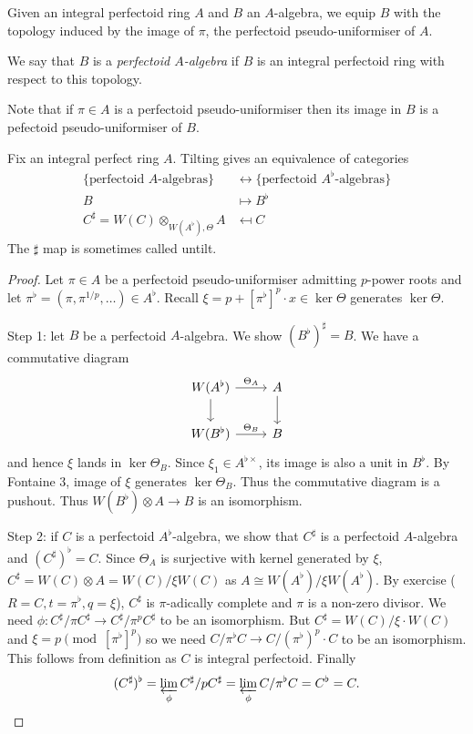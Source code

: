 \documentclass[a4paper]{article}
\newcommand{\tilt}{\flat} %
\begin{document}
\begin{definition}
  Given an integral perfectoid ring \(A\) and \(B\) an \(A\)-algebra, we equip \(B\) with the topology induced by the image of \(\pi\), the perfectoid pseudo-uniformiser of \(A\).

  We say that \(B\) is a \emph{perfectoid \(A\)-algebra} if \(B\) is an integral perfectoid ring with respect to this topology.
\end{definition}

Note that if \(\pi \in A\) is a perfectoid pseudo-uniformiser then its image in \(B\) is a pefectoid pseudo-uniformiser of \(B\).

\begin{theorem}
  Fix an integral perfect ring \(A\). Tilting gives an equivalence of categories
  \begin{align*}
    \{\text{perfectoid \(A\)-algebras}\} &\longleftrightarrow \{\text{perfectoid \(A^\tilt\)-algebras}\} \\
    B &\mapsto B^\tilt \\
    C^\sharp = W(C) \otimes_{W(A^\tilt), \Theta} A &\mapsfrom C
  \end{align*}
  The \(\sharp\) map is sometimes called untilt.
\end{theorem}

\begin{proof}
  Let \(\pi \in A\) be a perfectoid pseudo-uniformiser admitting \(p\)-power roots and let \(\pi^\tilt = (\pi, \pi^{1/p}, \dots) \in A^\tilt\). Recall \(\xi = p + [\pi^\tilt]^p \cdot x \in \ker \Theta\) generates \(\ker \Theta\).

  Step 1: let \(B\) be a perfectoid \(A\)-algebra. We show \((B^\tilt)^\sharp = B\). We have a commutative diagram
  \[
    \begin{tikzcd}
      W(A^\tilt) \ar[r, "\Theta_A"] \ar[d] & A \ar[d] \\
      W(B^\tilt) \ar[r, "\Theta_B"] & B
    \end{tikzcd}
  \]
  and hence \(\xi\) lands in \(\ker \Theta_B\). Since \(\xi_1 \in A^{\tilt \times}\), its image is also a unit in \(B^\tilt\). By Fontaine 3, image of \(\xi\) generates \(\ker \Theta_B\). Thus the commutative diagram is a pushout. Thus \(W(B^\tilt) \otimes A \to B\) is an isomorphism.

  Step 2: if \(C\) is a perfectoid \(A^\tilt\)-algebra, we show that \(C^\sharp\) is a perfectoid \(A\)-algebra and \((C^\sharp)^\tilt = C\). Since \(\Theta_A\) is surjective with kernel generated by \(\xi\), \(C^\sharp = W(C) \otimes A = W(C)/\xi W(C)\) as \(A \cong W(A^\tilt)/ \xi W(A^\tilt)\). By exercise (\(R = C, t = \pi^\tilt, q = \xi\)), \(C^\sharp\) is \(\pi\)-adically complete and \(\pi\) is a non-zero divisor. We need \(\phi: C^\sharp/\pi C^\sharp \to C^\sharp/\pi^p C^\sharp\) to be an isomorphism. But \(C^\sharp = W(C)/\xi \cdot W(C)\) and \(\xi = p \pmod{[\pi^\tilt]^p}\) so we need \(C/\pi^\tilt C \to C/(\pi^\tilt)^p \cdot C\) to be an isomorphism. This follows from definition as \(C\) is integral perfectoid. Finally
  \[
    (C^\sharp)^\tilt = \varprojlim_\phi C^\sharp/pC^\sharp = \varprojlim_\phi C/\pi^\tilt C = C^\tilt = C.
  \]
\end{proof}
\end{document}
